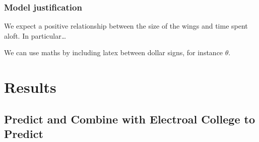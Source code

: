 \documentclass[
  letterpaper,
  DIV=11,
  numbers=noendperiod]{scrartcl}
\begin{document}
\subsubsection{Model justification}\label{model-justification}

We expect a positive relationship between the size of the wings and time
spent aloft. In particular\ldots{}

We can use maths by including latex between dollar signs, for instance
\(\theta\).

\section{Results}\label{results}

\subsection{Predict and Combine with Electroal College to
Predict}\label{predict-and-combine-with-electroal-college-to-predict}
\end{document}
